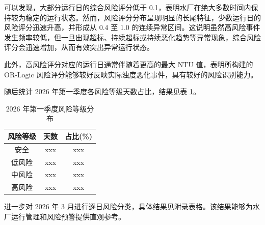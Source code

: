 \documentclass[UTF8,zihao=-4]{ctexart}
\begin{document}
可以发现，大部分运行日的综合风险评分低于 0.1，表明水厂在绝大多数时间内保持较为稳定的运行状态。然而，风险评分分布呈现明显的长尾特征，少数运行日的风险评分迅速升高，并形成从 0.4 至 1.0 的连续异常区间。这说明虽然高风险事件发生频率较低，但一旦出现超标、持续超标或持续恶化趋势等异常现象，综合风险评分会迅速增加，从而有效突出异常运行状态。

此外，高风险评分对应的运行日通常伴随着更高的最大 NTU 值，表明所构建的 OR-Logic 风险评分能够较好反映实际浊度恶化事件，具有较好的风险识别能力。

随后统计 2026 年第一季度各风险等级天数占比，结果见表 \ref{tab:q1_risk_summary}。

\begin{table}[H]
\centering
\caption{2026 年第一季度风险等级分布}
\begin{tabular}{ccc}
\toprule
风险等级 & 天数 & 占比(\%) \\
\midrule
安全 & xxx & xxx \\
低风险 & xxx & xxx \\
中风险 & xxx & xxx \\
高风险 & xxx & xxx \\
\bottomrule
\end{tabular}
\label{tab:q1_risk_summary}
\end{table}

进一步对 2026 年 3 月进行逐日风险分类，具体结果见附录表格。该结果能够为水厂运行管理和风险预警提供直观参考。


\newpage

\end{document}
